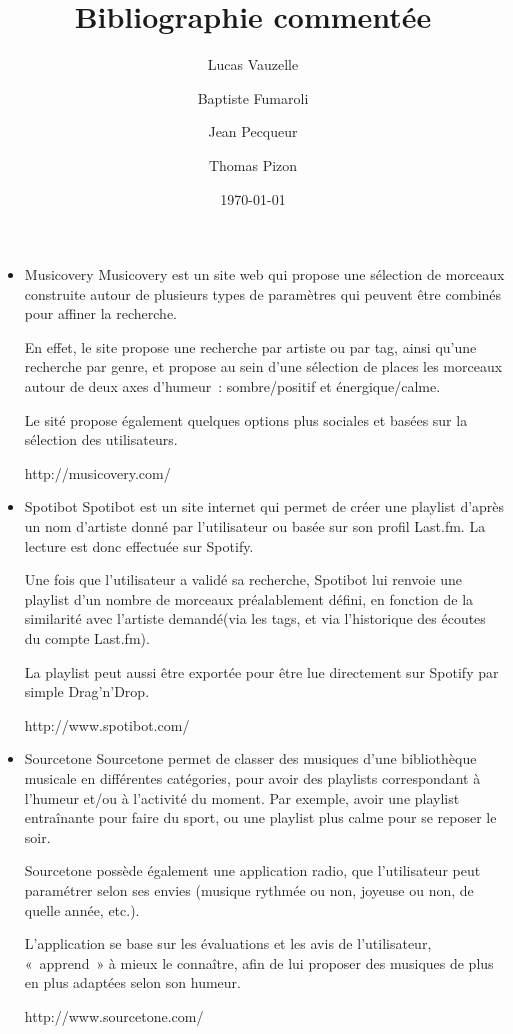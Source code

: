 \documentclass{article}
\title{Bibliographie commentée}
\author{Lucas Vauzelle \and Baptiste Fumaroli \and Jean Pecqueur \and Thomas Pizon}
\date{\today}
\begin{document}
\maketitle

\begin{itemize}

\item Musicovery
Musicovery est un site web qui propose une sélection de morceaux construite
autour de plusieurs types de paramètres qui peuvent être combinés pour affiner
la recherche.

En effet, le site propose une recherche par artiste ou par tag, ainsi qu'une
recherche par genre, et propose au sein d'une sélection de places les morceaux
autour de deux axes d'humeur~: sombre/positif et énergique/calme.

Le sité propose également quelques options plus sociales et basées sur la
sélection des utilisateurs.

http://musicovery.com/

\item Spotibot
Spotibot est un site internet qui permet de créer une playlist d'après un nom
d'artiste donné par l'utilisateur ou basée sur son profil Last.fm. La lecture
est donc effectuée sur Spotify.

Une fois que l'utilisateur a validé sa recherche, Spotibot lui renvoie une
playlist d'un nombre de morceaux préalablement défini, en fonction de la
similarité avec l'artiste demandé(via les tags, et via l'historique des écoutes
du compte Last.fm).

La playlist peut aussi être exportée pour être lue directement sur Spotify par
simple Drag'n'Drop.

http://www.spotibot.com/

\item Sourcetone
Sourcetone permet de classer des musiques d'une bibliothèque musicale en
différentes catégories, pour avoir des playlists correspondant à l'humeur et/ou
à l'activité du moment. Par exemple, avoir une playlist entraînante pour faire
du sport, ou une playlist plus calme pour se reposer le soir.

Sourcetone possède également une application radio, que l'utilisateur peut
paramétrer selon ses envies (musique rythmée ou non, joyeuse ou non, de quelle
année, etc.).

L'application se base sur les évaluations et les avis de l'utilisateur,
«~apprend~» à mieux le connaître, afin de lui proposer des musiques de plus en
plus adaptées selon son humeur.

http://www.sourcetone.com/

\end{itemize}
\end{document}

